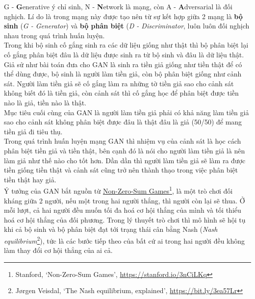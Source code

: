 \documentclass[a4paper]{article}
\begin{document}
\noindent
G - \textbf{G}enerative ý chỉ sinh, N - \textbf{N}etwork là mạng, còn A - \textbf{A}dversarial là đối nghịch. Lí do là trong mạng này được tạo nên từ sự kết hợp giữa 2 mạng là \textbf{bộ sinh} (\textit{G - Generator}) và \textbf{bộ phân biệt} (\textit{D - Discriminator}, luôn luôn đối nghịch nhau trong quá trình huấn luyện.\\
Trong khi bộ sinh cố gắng sinh ra các dữ liệu giống như thật thì bộ phân biệt lại cố gắng phân biệt đâu là dữ liệu được sinh ra từ bộ sinh và đâu là dữ liệu thật.\\

\noindent
Giả sử như bài toán đưa cho GAN là sinh ra tiền giả giống như tiền thật để có thể dùng được, bộ sinh là người làm tiền giả, còn bộ phân biệt giống như cảnh sát. Người làm tiền giả sẽ cố gắng làm ra những tờ tiền giả sao cho cảnh sát không biết đó là tiền giả, còn cảnh sát thì cố gắng học để phân biệt được tiền nào là giả, tiền nào là thật.\\
Mục tiêu cuối cùng của GAN là người làm tiền giả phải có khả năng làm tiền giả sao cho cảnh sát không phân biệt được đâu là thật đâu là giả (50/50) để mang tiền giả đi tiêu thụ.\\
Trong quá trình huấn luyện mạng GAN thì nhiệm vụ của cảnh sát là học cách phân biệt tiền giả và tiền thật, bên cạnh đó là nói cho người làm tiền giả là nên làm giả như thế nào cho tốt hơn. Dần dần thì người làm tiền giả sẽ làm ra được tiền giống tiền thật và cảnh sát cũng trở nên thành thạo trong việc phân biệt tiền thật hay giả.\\

\noindent
Ý tưởng của GAN bắt nguồn từ \href{https://cs.stanford.edu/people/eroberts/courses/soco/projects/1998-99/game-theory/nonzero.html}{Non-Zero-Sum Games}\footnote{Stanford, \lq Non-Zero-Sum Games\rq, \href{https://stanford.io/3nCiLKq}{https://stanford.io/3nCiLKq}}, là một trò chơi đối kháng giữa 2 người, nếu một trong hai người thắng, thì người còn lại sẽ thua. Ở mỗi lượt, cả hai người đều muốn tối đa hoá cơ hội thắng của mình và tối thiểu hoá cơ hội thắng của đối phương. Trong lý thuyết trò chơi thì mô hình sẽ hội tụ khi cả bộ sinh và bộ phân biệt đạt tới trạng thái cân bằng Nash (\textit{Nash equilibrium}\footnote{Jørgen Veisdal, \lq The Nash equilibrium, explained\rq, \href{https://bit.ly/3ea57Lr}{https://bit.ly/3ea57Lr}}), tức là các bước tiếp theo của bất cứ ai trong hai người đều không làm thay đổi cơ hội thẳng của ai cả.
\end{document}
